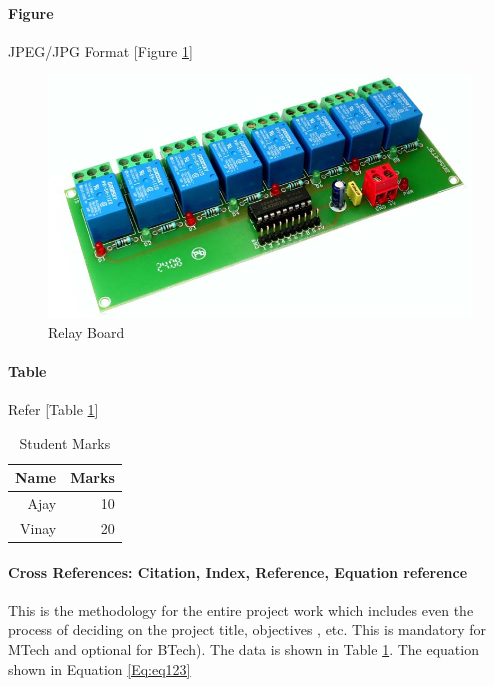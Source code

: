 \paragraph*{Figure} JPEG/JPG Format [Figure \ref{fig:rb}]
\begin{figure}[h]
	\begin{center}
		\includegraphics[scale=0.3]{Figures/relay.jpg}
		\caption{Relay Board}
		\label{fig:rb}
	\end{center}
\end{figure}

\paragraph*{Table} Refer [Table \ref{tab:sm}]
\begin{table}[h]
	\centering
	\caption{Student Marks}
	\begin{tabular}{rr}
		\toprule
		Name  & Marks \\
		\midrule
		Ajay  & 10 \\
		Vinay & 20 \\
		\bottomrule
	\end{tabular}%
	\label{tab:sm}%
\end{table}%


\paragraph*{Cross References: Citation, Index, Reference, Equation reference}
This is the methodology for the entire project work which includes even the process of deciding on the project title, objectives
, etc. This is mandatory for MTech and optional for BTech)\cite{abcdef}. The data is shown in Table \ref{tab:sm}. The equation shown in Equation \eqref{Eq:eq123}

